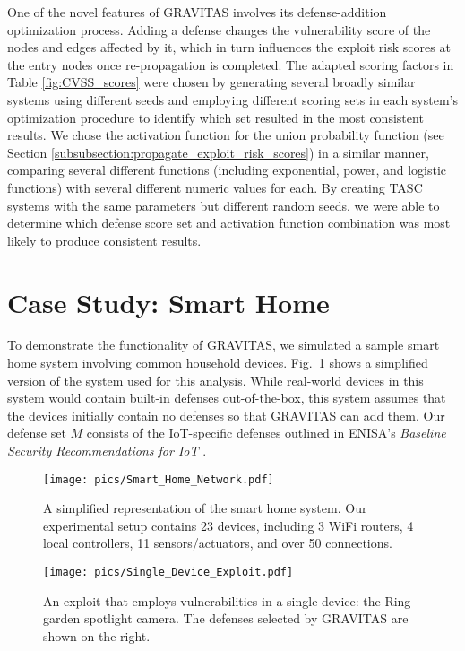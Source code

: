 \documentclass[10pt,journal,compsoc]{IEEEtran}
\begin{document}
\par One of the novel features of GRAVITAS involves its defense-addition optimization process. Adding a defense changes the vulnerability score of the nodes and edges affected by it, which in turn influences the exploit risk scores at the entry nodes once re-propagation is completed. The adapted scoring factors in Table \ref{fig:CVSS_scores} were chosen by generating several broadly similar systems using different seeds and employing different scoring sets in each system's optimization procedure to identify which set resulted in the most consistent results. We chose the activation function for the union probability function (see Section \ref{subsubsection:propagate_exploit_risk_scores}) in a similar manner, comparing several different functions (including exponential, power, and logistic functions) with several different numeric values for each. By creating TASC systems with the same parameters but different random seeds, we were able to determine which defense score set and activation function combination was most likely to produce consistent results.

\section{Case Study: Smart Home}
\label{section:example_application}

\par To demonstrate the functionality of GRAVITAS, we simulated a sample smart home system involving 
common household devices. Fig.~\ref{fig:smart_home_system} shows a simplified version of the system 
used for this analysis. While real-world devices in this system would contain built-in defenses 
out-of-the-box, this system assumes that the devices initially contain no defenses so that GRAVITAS 
can add them. Our defense set $M$ consists of the IoT-specific defenses outlined in ENISA's \textit{Baseline Security Recommendations for IoT}  \cite{enisa2017}. 
\begin{figure}[h!]
\centering
\texttt{[image: pics/Smart\_Home\_Network.pdf]}
\caption{A simplified representation of the smart home system. Our experimental setup contains 23
devices, including 3 WiFi routers, 4 local controllers, 11 sensors/actuators, and over 50 connections.} 
\label{fig:smart_home_system}
\end{figure}

\begin{figure}[h!]
\centering
\texttt{[image: pics/Single\_Device\_Exploit.pdf]}
\caption{An exploit that employs vulnerabilities in a single device: the Ring garden spotlight camera. The defenses selected by GRAVITAS are shown on the right.} 
\label{fig:single_exploit}
\end{figure}
\end{document}
